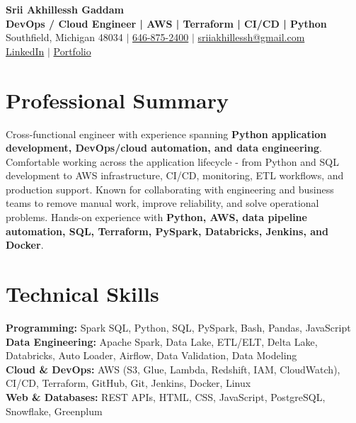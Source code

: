 \documentclass[letterpaper,10pt]{article}
\begin{document}
\fontsize{9.35pt}{10.45pt}\selectfont

\begin{center}
    {\LARGE \textbf{Srii Akhillessh Gaddam}} \\[-1pt]
    \textbf{DevOps / Cloud Engineer | AWS | Terraform | CI/CD | Python} \\[2pt]
    Southfield, Michigan 48034 $|$
    \href{tel:6468752400}{646-875-2400} $|$
    \href{mailto:sriiakhillessh@gmail.com}{sriiakhillessh@gmail.com} \\[1pt]
    \href{https://www.linkedin.com/in/srii-akhiilessh-gaddam-b48668191/}{LinkedIn} $|$
    \href{https://sriiakhillesshg.github.io/portfolio/}{Portfolio}
\end{center}
\vspace{-8pt}

\section{Professional Summary}
\small{Cross-functional engineer with experience spanning \textbf{Python application development, DevOps/cloud automation, and data engineering}. Comfortable working across the application lifecycle - from Python and SQL development to AWS infrastructure, CI/CD, monitoring, ETL workflows, and production support. Known for collaborating with engineering and business teams to remove manual work, improve reliability, and solve operational problems. Hands-on experience with \textbf{Python, AWS, data pipeline automation, SQL, Terraform, PySpark, Databricks, Jenkins, and Docker}.}

\section{Technical Skills}
\small{
\textbf{Programming:} Spark SQL, Python, SQL, PySpark, Bash, Pandas, JavaScript \\
\textbf{Data Engineering:} Apache Spark, Data Lake, ETL/ELT, Delta Lake, Databricks, Auto Loader, Airflow, Data Validation, Data Modeling \\
\textbf{Cloud \& DevOps:} AWS (S3, Glue, Lambda, Redshift, IAM, CloudWatch), CI/CD, Terraform, GitHub, Git, Jenkins, Docker, Linux \\
\textbf{Web \& Databases:} REST APIs, HTML, CSS, JavaScript, PostgreSQL, Snowflake, Greenplum
}
\end{document}
